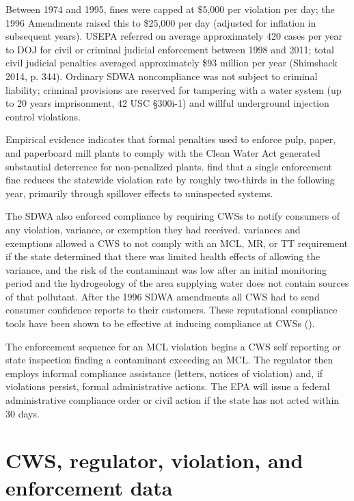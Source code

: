 \documentclass{article}
\begin{document}
Between 1974 and 1995, fines were capped at \$5,000 per violation per day; the 1996 Amendments raised this to \$25,000 per day (adjusted for inflation in subsequent years). USEPA referred on average approximately 420 cases per year to DOJ for civil or criminal judicial enforcement between 1998 and 2011; total civil judicial penalties averaged approximately \$93 million per year (Shimshack 2014, p. 344). Ordinary SDWA noncompliance was not subject to criminal liability; criminal provisions are reserved for tampering with a water system (up to 20 years imprisonment, 42 USC §300i-1) and willful underground injection control violations.

Empirical evidence indicates that formal penalties used to enforce pulp, paper, and paperboard mill plants to comply with the Clean Water Act generated substantial deterrence for non-penalized plants. \cite{shimshack2005regulator} find that a single enforcement fine reduces the statewide violation rate by roughly two-thirds in the following year, primarily through spillover effects to uninspected systems.

The SDWA also enforced compliance by requiring CWSs to notify consumers of any violation, variance, or exemption they had received. variances and exemptions allowed a CWS to not comply with an MCL, MR, or TT requirement if the state determined that there was limited health effects of allowing the variance, and the risk of the contaminant was low after an initial monitoring period and the hydrogeology of the area supplying water does not contain sources of that pollutant. After the 1996 SDWA amendments all CWS had to send consumer confidence reports to their customers. These reputational compliance tools have been shown to be effective at inducing compliance at CWSs (\cite{bennear2008impacts}).

The enforcement sequence for an MCL violation begins a CWS self reporting or state inspection finding a contaminant exceeding an MCL. The regulator then employs informal compliance assistance (letters, notices of violation) and, if violations persist, formal administrative actions. The EPA will issue a federal administrative compliance order or civil action if the state has not acted within 30 days.

\section{CWS, regulator, violation, and enforcement data}
\end{document}
